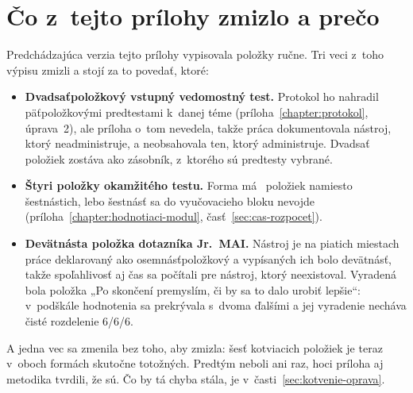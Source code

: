 \section{Čo z~tejto prílohy zmizlo a prečo}
\label{sec:prilohaA-zmeny}

Predchádzajúca verzia tejto prílohy vypisovala položky ručne. Tri veci z~toho
výpisu zmizli a stojí za to povedať, ktoré:

\begin{itemize}[nosep]
    \item \textbf{Dvadsaťpoložkový vstupný vedomostný test.} Protokol ho nahradil
          päťpoložkovými predtestami k~danej téme (príloha~\ref{chapter:protokol},
          úprava~2), ale príloha o~tom nevedela, takže práca dokumentovala
          nástroj, ktorý neadministruje, a neobsahovala ten, ktorý administruje.
          Dvadsať položiek zostáva ako zásobník, z~ktorého sú predtesty vybrané.
    \item \textbf{Štyri položky okamžitého testu.} Forma má
          \asmFormItems{}~položiek namiesto šestnástich, lebo šestnásť sa do
          vyučovacieho bloku nevojde (príloha~\ref{chapter:hodnotiaci-modul},
          časť~\ref{sec:cas-rozpocet}).
    \item \textbf{Devätnásta položka dotazníka Jr.~MAI.} Nástroj je na piatich
          miestach práce deklarovaný ako osemnásťpoložkový a vypísaných ich bolo
          devätnásť, takže spoľahlivosť aj čas sa počítali pre nástroj, ktorý
          neexistoval. Vyradená bola položka „Po skončení premyslím, či by sa to
          dalo urobiť lepšie“: v~podškále hodnotenia sa prekrývala s~dvoma
          ďalšími a jej vyradenie necháva čisté rozdelenie 6/6/6.
\end{itemize}

A jedna vec sa zmenila bez toho, aby zmizla: šesť kotviacich položiek je teraz
v~oboch formách skutočne totožných. Predtým neboli ani raz, hoci príloha aj
metodika tvrdili, že sú. Čo by tá chyba stála, je v~časti~\ref{sec:kotvenie-oprava}.
